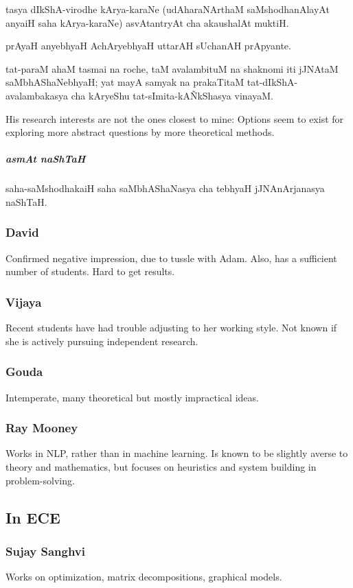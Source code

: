 \documentclass[oneside, article]{memoir}
\begin{document}
tasya dIkShA-virodhe kArya-karaNe (udAharaNArthaM saMshodhanAlayAt anyaiH saha kArya-karaNe) asvAtantryAt cha akaushalAt muktiH.

prAyaH anyebhyaH AchAryebhyaH uttarAH sUchanAH prApyante.

tat-paraM ahaM tasmai na roche, taM avalambituM na shaknomi iti jJNAtaM saMbhAShaNebhyaH; yat mayA samyak na prakaTitaM tat-dIkShA-avalambakasya cha kAryeShu tat-sImita-kA\~NkShasya vinayaM.

His research interests are not the ones closest to mine: Options seem to exist for exploring more abstract questions by more theoretical methods.

\subparagraph{asmAt naShTaH}
saha-saMshodhakaiH saha saMbhAShaNasya cha tebhyaH jJNAnArjanasya naShTaH.



\subsubsection{David}
Confirmed negative impression, due to tussle with Adam. Also, has a sufficient number of students. Hard to get results.

\subsubsection{Vijaya}
Recent students have had trouble adjusting to her working style. Not known if she is actively pursuing independent research.

\subsubsection{Gouda}
Intemperate, many theoretical but mostly impractical ideas.

\subsubsection{Ray Mooney}
Works in NLP, rather than in machine learning. Is known to be slightly averse to theory and mathematics, but focuses on heuristics and system building in problem-solving.

\subsection{In ECE}

\subsubsection{Sujay Sanghvi}
Works on optimization, matrix decompositions, graphical models.
\end{document}
